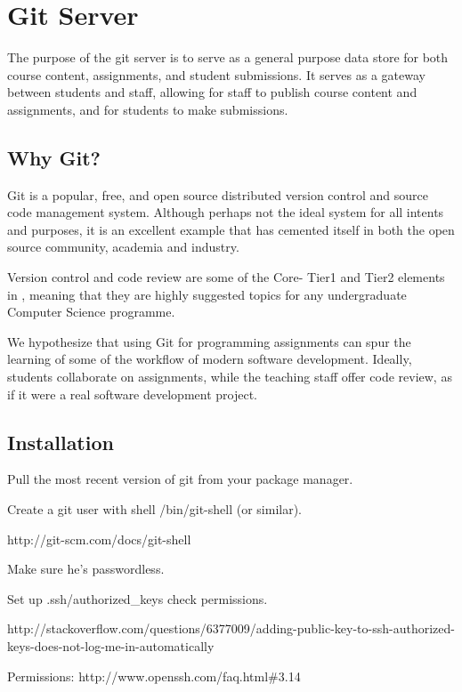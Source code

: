 
\section{Git Server}

The purpose of the git server is to serve as a general purpose data store for
both course content, assignments, and student submissions. It serves as a
gateway between students and staff, allowing for staff to publish course
content and assignments, and for students to make submissions.

\subsection{Why Git?}

Git is a popular\cite{ohloh-2014}, free, and open source distributed version
control and source code management system\cite{git-2014}. Although perhaps not
the ideal system for all intents and purposes, it is an excellent example that
has cemented itself in both the open source community, academia and
industry\cite{gitprojects-2014}.

Version control and code review are some of the Core- Tier1 and Tier2 elements
in \cite{cs-curricula-2013}, meaning that they are highly suggested topics for
any undergraduate Computer Science programme.

We hypothesize that using Git for programming assignments can spur the learning
of some of the workflow of modern software development. Ideally, students
collaborate on assignments, while the teaching staff offer code review, as if
it were a real software development project.

\subsection{Installation}

Pull the most recent version of git from your package manager.

Create a git user with shell /bin/git-shell (or similar).

http://git-scm.com/docs/git-shell

Make sure he's passwordless.

Set up .ssh/authorized\_keys check permissions.

http://stackoverflow.com/questions/6377009/adding-public-key-to-ssh-authorized-keys-does-not-log-me-in-automatically

Permissions: http://www.openssh.com/faq.html\#3.14


